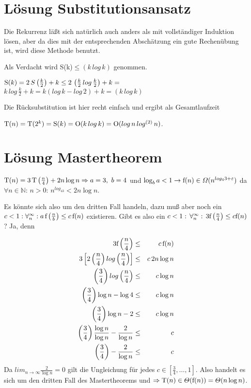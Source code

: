 \documentclass[ngerman]{scrreprt}%
\theoremstyle{break}
\begin{document}
\section{Lösung Substitutionsansatz}
\label{lsg_substitutionsansatz}

Die Rekurrenz läßt sich natürlich auch anders als mit vollständiger Induktion lösen, aber da dies mit der entsprechenden Abschätzung ein
gute Rechenübung ist, wird diese Methode benutzt.

Als Verdacht wird S(k)$\leq(k\,log\,k)$ genommen.

\noindent
\(\textup{S}(k) = 2\,S\left(\frac{k}{2}\right)+k\leq 2\,\left(\frac{k}{2}\,log\,\frac{k}{2}\right)+k=\)
\(k\,log\,\frac{k}{2}+k=k \left(log\,k-log\,2\right)+k=(k\,log\,k)\)

Die Rücksubstitution ist hier recht einfach und ergibt als Gesamtlaufzeit

$\textup{T}(n)=\textup{T}(2^k)=\textup{S}(k)=\textup{O}(k\,log\,k)=\textup{O}(log\,n\,log^{(2)}\,n)$.

\section{Lösung Mastertheorem}
\label{mastertheorem_Fall3}

\( \textup{T}(n) = 3\,\textup{T}\left(\frac{n}{4}\right) + 2n\log n \Rightarrow a=3,\ b=4\) und \(\log_ba<1 \rightarrow 
\textup{f}(n) \in \Omega(n^{log_43+\varepsilon})\) da \(\forall n \in \mathbb{N}:\,n>0:\,n^{log_43}<2n\log n\).

Es könnte sich also um den dritten Fall handeln, dazu muß aber noch ein \(c < 1 : \forall^{\infty}_{n}:
a\,\textup{f}\left(\frac{n}{b}\right)  \leq c\,\textup{f}(n)\) existieren. Gibt es also ein 
\(c<1:\,\forall^{\infty}_{n}:\,3\textup{f}\left(\frac{n}{4}\right) \leq c\textup{f}(n)\)? Ja, denn

\begin{eqnarray*}
3\textup{f}\left(\frac{n}{4}\right) & \leq & c\,\textup{f}(n)\\
3\left[2\left(\frac{n}{4}\right) log \left(\frac{n}{4}\right)\right] & \leq & c\,2n \log n\\
\left(\frac{3}{4}\right) log \left(\frac{n}{4}\right) & \leq & c \log n\\
\left(\frac{3}{4}\right) \log n- \log 4 & \leq & c \log n\\
\left(\frac{3}{4}\right) \log n- 2 & \leq & c \log n\\
\left(\frac{3}{4}\right) \frac{\log n}{\log n}-\frac{2}{\log n} & \leq & c\\
\left(\frac{3}{4}\right) -\frac{2}{\log n} & \leq & c
\end{eqnarray*}
Da \(lim_{n \to \infty} \frac{2}{\log n}=0\) gilt die Ungleichung für jedes \(c \in [\frac{3}{4},\ldots,1]\). %
Also handelt es sich um den dritten Fall des Mastertheorems und 
\( \Rightarrow \textup{T}(n) \in \Theta (\textup{f}(n))=\Theta (n\log n)\).
\end{document}
